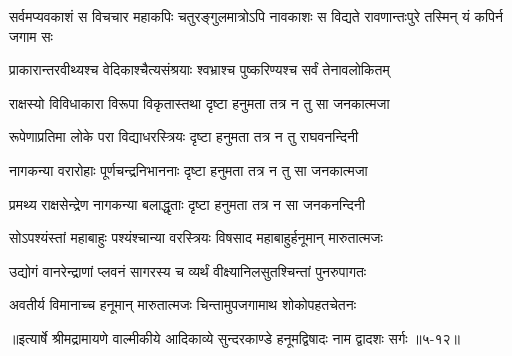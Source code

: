 \threelineshloka
{सर्वमप्यवकाशं स विचचार महाकपिः}
{चतुरङ्गुलमात्रोऽपि नावकाशः स विद्यते}
{रावणान्तःपुरे तस्मिन् यं कपिर्न जगाम सः} %

\twolineshloka
{प्राकारान्तरवीथ्यश्च वेदिकाश्चैत्यसंश्रयाः}
{श्वभ्राश्च पुष्करिण्यश्च सर्वं तेनावलोकितम्} %

\twolineshloka
{राक्षस्यो विविधाकारा विरूपा विकृतास्तथा}
{दृष्टा हनुमता तत्र न तु सा जनकात्मजा} %

\twolineshloka
{रूपेणाप्रतिमा लोके परा विद्याधरस्त्रियः}
{दृष्टा हनुमता तत्र न तु राघवनन्दिनी} %

\twolineshloka
{नागकन्या वरारोहाः पूर्णचन्द्रनिभाननाः}
{दृष्टा हनुमता तत्र न तु सा जनकात्मजा} %

\twolineshloka
{प्रमथ्य राक्षसेन्द्रेण नागकन्या बलाद्धृताः}
{दृष्टा हनुमता तत्र न सा जनकनन्दिनी} %

\twolineshloka
{सोऽपश्यंस्तां महाबाहुः पश्यंश्चान्या वरस्त्रियः}
{विषसाद महाबाहुर्हनूमान् मारुतात्मजः} %

\twolineshloka
{उद्योगं वानरेन्द्राणां प्लवनं सागरस्य च}
{व्यर्थं वीक्ष्यानिलसुतश्चिन्तां पुनरुपागतः} %

\twolineshloka
{अवतीर्य विमानाच्च हनूमान् मारुतात्मजः}
{चिन्तामुपजगामाथ शोकोपहतचेतनः} %


॥इत्यार्षे श्रीमद्रामायणे वाल्मीकीये आदिकाव्ये सुन्दरकाण्डे हनूमद्विषादः नाम द्वादशः सर्गः ॥५-१२॥
